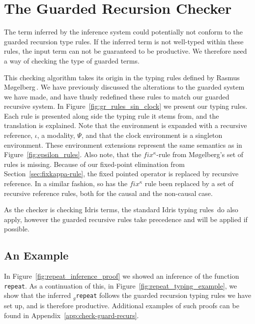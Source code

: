 \section{The Guarded Recursion Checker}
\label{sec:guard-recurs-check}
The term inferred by the inference system could potentially not conform to the
guarded recursion type rules. If the inferred term is not well-typed within
these rules, the input term can not be guaranteed to be productive. We
therefore need a way of checking the type of guarded terms.

This checking algorithm takes its origin in the typing rules defined by Rasmus
M\o gelberg\,\citep{Mogelberg:2014}. We have previously discussed the alterations
to the guarded system we have made, and have thusly redefined these rules to
match our guarded recursive system. In Figure~\ref{fig:gr_rules_sin_clock} we
present our typing rules. Each rule is presented along side the typing rule it
stems from, and the translation is explained. Note that the
environment is expanded with a recursive reference, $\iota$, a modality, $\Psi$,
and that the clock environment is a singleton environment. These environment extensions
represent the same semantics as in Figure~\ref{fig:epsilon_rules}. Also note,
that the $fix^\kappa$-rule from M\o gelberg's set of rules is missing. Because of our
fixed-point elimination from Section~\ref{sec:fixkappa-rule}, the fixed pointed
operator is replaced by recursive reference. In a similar fashion, so has the
$fix^\kappa$ rule been replaced by a set of recursive reference rules, both for
the causal and the non-causal case.

As the checker is checking Idris terms, the standard Idris typing
rules\,\citep{BradyIdrisImpl13} do also apply, however the guarded recursive
rules take precedence and will be applied if possible.


\subsection{An Example}
In Figure~\ref{fig:repeat_inference_proof} we showed an inference of the
function \texttt{repeat}. As a continuation of this, in Figure~\ref{fig:repeat_typing_example}, we show that the inferred
$_g$\texttt{repeat} follows the guarded recursion typing rules we have set up, and is therefore
productive. Additional examples of such proofs can be found in Appendix~\ref{app:check-guard-recurs}.


